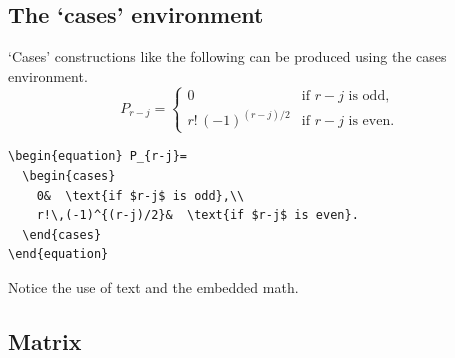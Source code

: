 \documentclass{article}
\newcommand{\ntt}{\normalfont\ttfamily}
\newcommand{\cn}[1]{{\protect\ntt\bslash#1}}
\newcommand{\env}[1]{{\protect\ntt#1}}
\theoremstyle{definition}
\theoremstyle{remark}
\begin{document}
\subsection{The `cases' environment}
`Cases' constructions like the following can be produced using
the \env{cases} environment.
\begin{equation}
P_{r-j}=
  \begin{cases}
    0&  \text{if $r-j$ is odd},\\
    r!\,(-1)^{(r-j)/2}&  \text{if $r-j$ is even}.
  \end{cases}
\end{equation}
\begin{verbatim}
\begin{equation} P_{r-j}=
  \begin{cases}
    0&  \text{if $r-j$ is odd},\\
    r!\,(-1)^{(r-j)/2}&  \text{if $r-j$ is even}.
  \end{cases}
\end{equation}
\end{verbatim}
Notice the use of \cn{text} and the embedded math.

\subsection{Matrix}
\end{document}
